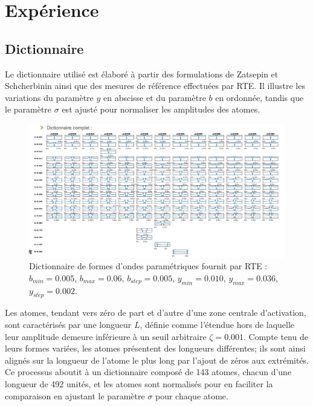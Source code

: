 \documentclass[9pt,a4paper,twoside]{rho}
\begin{document}
\newpage

\section{Expérience}

\subsection{Dictionnaire}

Le dictionnaire utilisé est élaboré à partir des formulations de Zatsepin et Schcherbinin ainsi que des mesures de référence effectuées par RTE. Il illustre les variations du paramètre $y$ en abscisse et du paramètre $b$ en ordonnée, tandis que le paramètre $\sigma$ est ajusté pour normaliser les amplitudes des atomes.


\begin{figure}[H]
    \centering
    \includegraphics[width=\linewidth]{images/dictionnaire_rte.png}
    \caption{Dictionnaire de formes d'ondes paramétriques fournit par RTE : $b_{min} = 0.005$, $b_{max} = 0.06$, $b_{step} = 0.005$, $y_{min} = 0.010$, $y_{max} = 0.036$, $y_{step} = 0.002$.}
    \label{fig:dict_rte}
\end{figure}

Les atomes, tendant vers zéro de part et d'autre d'une zone centrale d'activation, sont caractérisés par une longueur $L$, définie comme l'étendue hors de laquelle leur amplitude demeure inférieure à un seuil arbitraire $\zeta=0.001$. 
Compte tenu de leurs formes variées, les atomes présentent des longueurs différentes; ils sont ainsi alignés sur la longueur de l'atome le plus long par l'ajout de zéros aux extrémités. 
Ce processus aboutit à un dictionnaire composé de 143 atomes, chacun d'une longueur de 492 unités, et les atomes sont normalisés pour en faciliter la comparaison en ajustant le paramètre $\sigma$ pour chaque atome.
\end{document}
